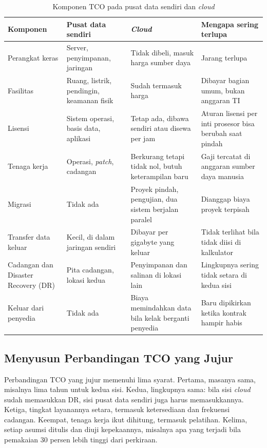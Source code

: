 \begin{table}[!htb]
  \centering
  \caption{Komponen TCO pada pusat data sendiri dan \textit{cloud}}
  \label{tab:ch03-komponen-tco}
  \footnotesize
  \begin{tabularx}{\textwidth}{>{\raggedright\arraybackslash}p{2.2cm} >{\raggedright\arraybackslash}X >{\raggedright\arraybackslash}X >{\raggedright\arraybackslash}X}
    \hline
    \textbf{Komponen} & \textbf{Pusat data sendiri} & \textbf{\textit{Cloud}} & \textbf{Mengapa
      sering terlupa} \\ \hline
    Perangkat keras & Server, penyimpanan, jaringan & Tidak dibeli, masuk harga sumber daya & Jarang
      terlupa \\ \hline
    Fasilitas & Ruang, listrik, pendingin, keamanan fisik & Sudah termasuk harga & Dibayar bagian
      umum, bukan anggaran TI \\ \hline
    Lisensi & Sistem operasi, basis data, aplikasi & Tetap ada, dibawa sendiri atau disewa per jam &
      Aturan lisensi per inti prosesor bisa berubah saat pindah \\ \hline
    Tenaga kerja & Operasi, \textit{patch}, cadangan & Berkurang tetapi tidak nol, butuh
      keterampilan baru & Gaji tercatat di anggaran sumber daya manusia \\ \hline
    Migrasi & Tidak ada & Proyek pindah, pengujian, dua sistem berjalan paralel & Dianggap biaya
      proyek terpisah \\ \hline
    Transfer data keluar & Kecil, di dalam jaringan sendiri & Dibayar per gigabyte yang keluar &
      Tidak terlihat bila tidak diisi di kalkulator \\ \hline
    Cadangan dan Disaster Recovery (DR) & Pita cadangan, lokasi kedua & Penyimpanan dan salinan di
      lokasi lain & Lingkupnya sering tidak setara di kedua sisi \\ \hline
    Keluar dari penyedia & Tidak ada & Biaya memindahkan data bila kelak berganti penyedia & Baru
      dipikirkan ketika kontrak hampir habis \\ \hline
  \end{tabularx}
\end{table}

\subsection{Menyusun Perbandingan TCO yang Jujur}

Perbandingan TCO yang jujur memenuhi lima syarat. Pertama, masanya sama, misalnya lima tahun untuk
kedua sisi. Kedua, lingkupnya sama: bila sisi \textit{cloud} sudah memasukkan DR, sisi pusat data
sendiri juga harus memasukkannya. Ketiga, tingkat layanannya setara, termasuk ketersediaan dan
frekuensi cadangan. Keempat, tenaga kerja ikut dihitung, termasuk pelatihan. Kelima, setiap asumsi
ditulis dan diuji kepekaannya, misalnya apa yang terjadi bila pemakaian 30 persen lebih tinggi dari
perkiraan.

